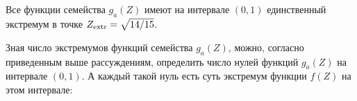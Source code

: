 














%





%

Все функции семейства $g_a(Z)$  имеют  на интервале $(0,1)$ единственный экстремум в точке $Z_{\rm extr}=\sqrt{14/15}$.

Зная число экстремумов функций семейства $g_a(Z)$, можно, согласно приведенным выше рассуждениям, определить число нулей функций $g_a(Z)$ на интервале  $(0,1)$. А каждый такой нуль есть суть экстремум функции $f(Z)$ на этом интервале:






